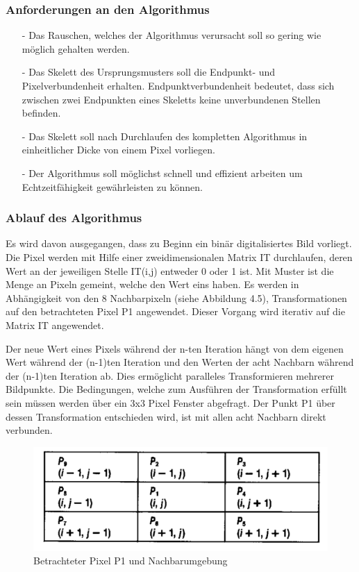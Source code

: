\subsubsection{Anforderungen an den Algorithmus}

\begin{itemize}
\item[-] Das Rauschen, welches der Algorithmus verursacht soll so gering wie möglich gehalten werden.
\item[-] Das Skelett des Ursprungsmusters soll die Endpunkt- und Pixelverbundenheit erhalten.
Endpunktverbundenheit bedeutet, dass sich zwischen zwei Endpunkten eines Skeletts keine unverbundenen Stellen befinden.
\item[-] Das Skelett soll nach Durchlaufen des kompletten Algorithmus in einheitlicher Dicke von einem Pixel vorliegen.
\item[-] Der Algorithmus soll möglichst schnell und effizient arbeiten um Echtzeitfähigkeit gewährleisten zu können. \\
\end{itemize}

\subsubsection{Ablauf des Algorithmus}

Es wird davon ausgegangen, dass zu Beginn ein binär digitalisiertes Bild vorliegt.
Die Pixel werden mit Hilfe einer zweidimensionalen Matrix IT durchlaufen, deren Wert an der jeweiligen Stelle IT(i,j) entweder 0 oder 1 ist.
Mit Muster ist die Menge an Pixeln gemeint, welche den Wert eins haben.
Es werden in Abhängigkeit von den 8 Nachbarpixeln (siehe Abbildung 4.5), Transformationen auf den betrachteten Pixel P1 angewendet. Dieser Vorgang wird iterativ auf die Matrix IT angewendet.

Der neue Wert eines Pixels während der n-ten Iteration hängt von dem eigenen Wert während der (n-1)ten Iteration und den Werten der acht Nachbarn während der (n-1)ten Iteration ab. Dies ermöglicht paralleles Transformieren mehrerer Bildpunkte. 
Die Bedingungen, welche zum Ausführen der Transformation erfüllt sein müssen werden über ein 3x3 Pixel Fenster abgefragt. Der Punkt P1 über dessen Transformation entschieden wird, ist mit allen acht Nachbarn direkt verbunden.\\
\begin{figure} [!ht]
\centering
\includegraphics[width=0.7\linewidth]{./Res/PixelNachbarschaft}
\caption{Betrachteter Pixel P1 und Nachbarumgebung}
\label{fig:PixelNachbarschaft}
\end{figure}

